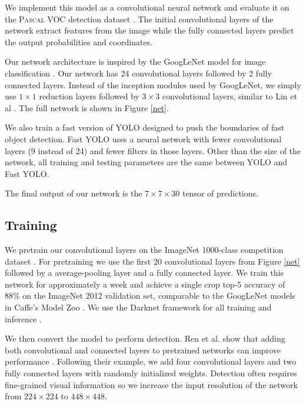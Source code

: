 We implement this model as a convolutional neural network and evaluate it on the \textsc{Pascal} VOC detection dataset \cite{Everingham15}. The initial convolutional layers of the network extract features from the image while the fully connected layers predict the output probabilities and coordinates.

Our network architecture is inspired by the GoogLeNet model for image classification \cite{DBLP:journals/corr/SzegedyLJSRAEVR14}. Our network has 24 convolutional layers followed by 2 fully connected layers. Instead of the inception modules used by GoogLeNet, we simply use $1 \times 1$ reduction layers followed by $3 \times 3$ convolutional layers, similar to Lin et al \cite{DBLP:journals/corr/LinCY13}. The full network is shown in Figure \ref{net}.

We also train a fast version of YOLO designed to push the boundaries of fast object detection. Fast YOLO uses a neural network with fewer convolutional layers (9 instead of 24) and fewer filters in those layers. Other than the size of the network, all training and testing parameters are the same between YOLO and Fast YOLO.

The final output of our network is the $7 \times 7 \times 30$ tensor of predictions.

\subsection{Training}

We pretrain our convolutional layers on the ImageNet 1000-class competition dataset \cite{ILSVRC15}. For pretraining we use the first 20 convolutional layers from Figure \ref{net} followed by a average-pooling layer and a fully connected layer. We train this network for approximately a week and achieve a single crop top-5 accuracy of 88\% on the ImageNet 2012 validation set, comparable to the GoogLeNet models in Caffe's Model Zoo \cite{zoo}. We use the Darknet framework for all training and inference \cite{darknet13}.

We then convert the model to perform detection. Ren et al. show that adding both convolutional and connected layers to pretrained networks can improve performance \cite{DBLP:journals/corr/RenHGZ015}. Following their example, we add four convolutional layers and two fully connected layers with randomly initialized weights. Detection often requires fine-grained visual information so we increase the input resolution of the network from $224 \times 224$ to $448 \times 448$.

